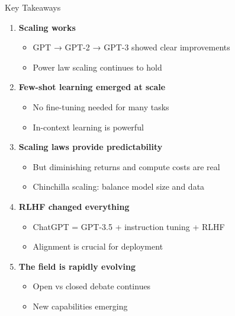 \documentclass[aspectratio=169]{beamer}
\begin{document}
\begin{frame}[shrink=10]{Key Takeaways 🔑}
    \begin{enumerate}\setlength{\itemsep}{0pt}
        \item \textbf{Scaling works}
        \begin{itemize}\setlength{\itemsep}{0pt}
            \item GPT → GPT-2 → GPT-3 showed clear improvements
            \item Power law scaling continues to hold
        \end{itemize}

        \vspace{0.3cm}

        \item \textbf{Few-shot learning emerged at scale}
        \begin{itemize}\setlength{\itemsep}{0pt}
            \item No fine-tuning needed for many tasks
            \item In-context learning is powerful
        \end{itemize}

        \vspace{0.3cm}

        \item \textbf{Scaling laws provide predictability}
        \begin{itemize}\setlength{\itemsep}{0pt}
            \item But diminishing returns and compute costs are real
            \item Chinchilla scaling: balance model size and data
        \end{itemize}

        \vspace{0.3cm}

        \item \textbf{RLHF changed everything}
        \begin{itemize}\setlength{\itemsep}{0pt}
            \item ChatGPT = GPT-3.5 + instruction tuning + RLHF
            \item Alignment is crucial for deployment
        \end{itemize}

        \vspace{0.3cm}

        \item \textbf{The field is rapidly evolving}
        \begin{itemize}\setlength{\itemsep}{0pt}
            \item Open vs closed debate continues
            \item New capabilities emerging
        \end{itemize}
    \end{enumerate}
\end{frame}
\end{document}
